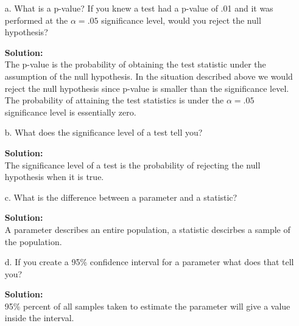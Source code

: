 \documentclass[12pt]{article}
\makeatletter
\theoremstyle{homework}
\newenvironment{exercise}[1]
{\def\@currentlabel{#1}\exercisecore}
{\endexercisecore}
\newcommand{\localhead}[1]{\par\smallskip\noindent\textbf{#1}\nobreak\\}%
\newcommand\solution{\localhead{Solution:}}
\makeatother
\begin{document}
\begin{exercise}{8} 
  \begin{enumerate}
    \item[a.] What is a p-value? If you knew a test had a p-value of .01 and it was performed at the $\alpha = .05$ significance level, 
    would you reject the null hypothesis?\\
    \solution The p-value is the probability of obtaining the test statistic under the assumption of the null hypothesis. In the situation described above we would reject the 
    null hypothesis since p-value is smaller than the significance level. The probability of attaining the test statistics is under the $\alpha = .05$ significance level is essentially zero. 
    \vspace{.15in}
    
    \item[b.] What does the significance level of a test tell you?\\
    \solution  The significance level of a test is the probability of rejecting the null hypothesis when it is true.
    \vspace{.15in}

    \item[c.] What is the difference between a parameter and a statistic?\\
    \solution A parameter describes an entire population, a statistic descirbes a sample of the population.
    \vspace{.15in}

    \item[d.] If you create a 95\% confidence interval for a parameter what does that tell you?\\
    \solution 95\% percent of all samples taken to estimate the parameter will give a value inside the interval.  

  \end{enumerate}
  
\end{exercise}
\end{document}
